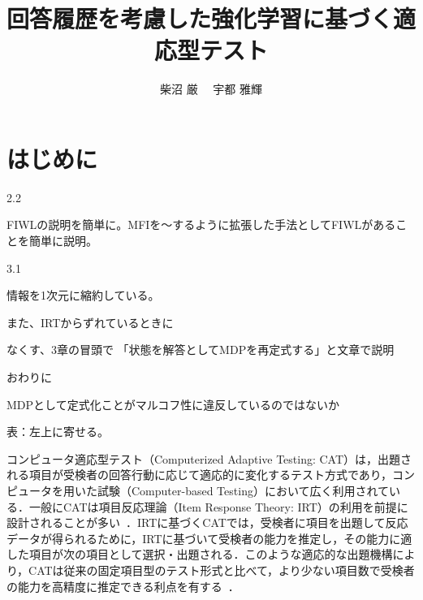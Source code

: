 \documentclass[dvipdfmx,a4j]{jarticle}
\begin{document}
\title{回答履歴を考慮した強化学習に基づく適応型テスト}

\author{柴沼 厳 \ \ 宇都 雅輝}



\maketitle
\thispagestyle{empty}

\section{はじめに}\label{sec:intro}

2.2

FIWLの説明を簡単に。MFIを～するように拡張した手法としてFIWLがあることを簡単に説明。


3.1

情報を1次元に縮約している。

また、IRTからずれているときに

なくす、3章の冒頭で 「状態を解答としてMDPを再定式する」と文章で説明

おわりに

MDPとして定式化ことがマルコフ性に違反しているのではないか

表：左上に寄せる。

コンピュータ適応型テスト（Computerized Adaptive Testing: CAT）は，出題される項目が受検者の回答行動に応じて適応的に変化するテスト方式であり，コンピュータを用いた試験（Computer-based Testing）において広く利用されている．一般にCATは項目反応理論（Item Response Theory: IRT）の利用を前提に設計されることが多い~\cite{vanderlinden2016}．IRTに基づくCATでは，受検者に項目を出題して反応データが得られるために，IRTに基づいて受検者の能力を推定し，その能力に適した項目が次の項目として選択・出題される．このような適応的な出題機構により，CATは従来の固定項目型のテスト形式と比べて，より少ない項目数で受検者の能力を高精度に推定できる利点を有する~\cite{frey2023,wainer2000}．
\end{document}
